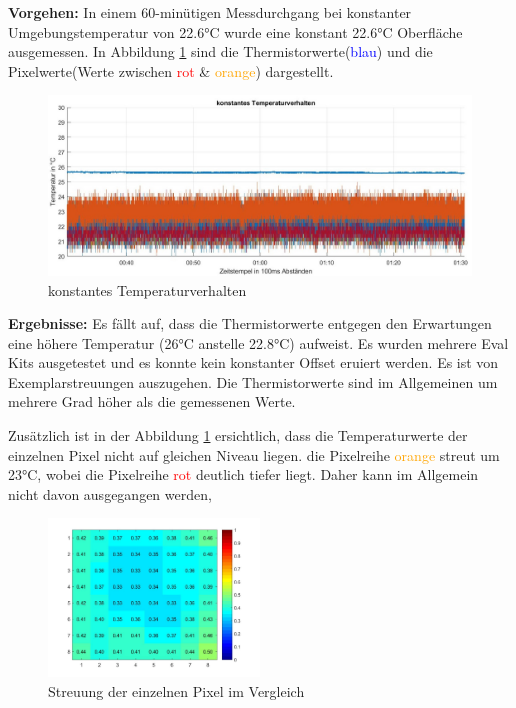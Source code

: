 \textbf{Vorgehen:} In einem 60-minütigen Messdurchgang bei konstanter Umgebungstemperatur von 22.6°C wurde eine konstant 22.6°C Oberfläche ausgemessen. In Abbildung \ref{fig:temperaturverhalten} sind die Thermistorwerte(\textcolor{blue}{blau}) und die Pixelwerte(Werte zwischen \textcolor{red}{rot} \& \textcolor{orange}{orange}) dargestellt.
\begin{figure}[H]
	\centering
	\includegraphics[width=1.0\textwidth]{fig/Temperaturverhalten}
	\caption[konstantes Temperaturverhalten]{konstantes Temperaturverhalten}
	\label{fig:temperaturverhalten}
\end{figure}

\textbf{Ergebnisse:} Es fällt auf, dass die Thermistorwerte entgegen den Erwartungen eine höhere Temperatur (26°C anstelle 22.8°C) aufweist. Es wurden mehrere Eval Kits ausgetestet und es konnte kein konstanter Offset eruiert werden. Es ist von Exemplarstreuungen auszugehen. Die Thermistorwerte sind im Allgemeinen um mehrere Grad höher als die gemessenen Werte. 

Zusätzlich ist in der Abbildung \ref{fig:temperaturverhalten} ersichtlich, dass die Temperaturwerte der einzelnen Pixel nicht auf gleichen Niveau liegen. die Pixelreihe \textcolor{orange}{orange} streut um 23°C, wobei die Pixelreihe \textcolor{red}{rot} deutlich tiefer liegt. Daher kann im Allgemein nicht davon ausgegangen werden,  


\begin{figure}[H]
	\centering
	\includegraphics[width=0.5\textwidth]
	{fig/Distanz_140cm_std_.jpg}
	\caption[Streuung der einzelnen Pixel im Vergleich]{Streuung der einzelnen Pixel im Vergleich}
	\label{fig:Streuung}
\end{figure}


